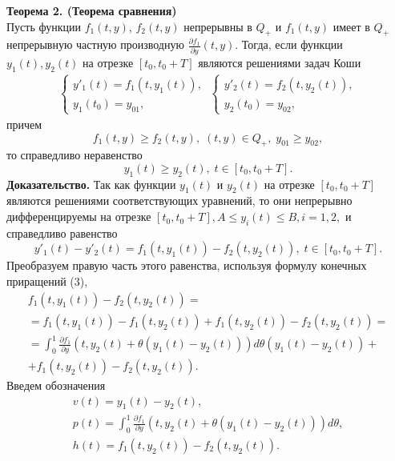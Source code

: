 \textbf{Теорема 2. (Теорема сравнения)}\\
Пусть функции $f_1(t,y)$, $f_2(t,y)$ непрерывны в $Q_+$ и $f_1(t,y)$ имеет в $Q_+$ непрерывную частную производную $\frac{\partial f_1}{\partial y}(t,y)$. Тогда, если функции $y_1(t), y_2(t)$ на отрезке $[t_0,t_0+T]$ являются решениями задач Коши
\begin{equation*}
\begin{split}
\begin{cases}
y'_1(t)=f_1(t,y_1(t)),\\
y_1(t_0)=y_{01},
\end{cases}
\:
\begin{cases}
y'_2(t)=f_2(t,y_2(t)),\\
y_2(t_0)=y_{02},
\end{cases}
\end{split}
\end{equation*}
причем
\begin{equation*}
f_1(t,y)\geq f_2(t,y), \;(t,y)\in Q_+, \;y_{01}\geq y_{02},
\end{equation*}
то справедливо неравенство
\begin{equation*}
y_1(t)\geq y_2(t),\; t\in [t_0,t_0+T].
\end{equation*}
\textbf{Доказательство.} Так как функции $y_1(t)$ и $y_2(t)$ на отрезке $[t_0,t_0+T]$ являются решениями соответствующих уравнений, то они непрерывно дифференцируемы на отрезке $[t_0,t_0+T], A \leq y_i(t) \leq B, i=1,2,$ и справедливо равенство
\begin{equation*}\tag{4}
y'_1(t)-y'_2(t)=f_1(t,y_1(t))-f_2(t,y_2(t)), \;t\in[t_0,t_0+T].
\end{equation*}
Преобразуем правую часть этого равенства, используя формулу конечных приращений (3),
\begin{equation*}
\begin{split}
f_1(t,y_1(t))-f_2(t,y_2(t))= \\
=f_1(t,y_1(t))-f_1(t,y_2(t))+f_1(t,y_2(t))-f_2(t,y_2(t))=\\
=\int_0^1 \frac{\partial f_1}{\partial y}(t,y_2(t)+\theta(y_1(t)-y_2(t)))d\theta(y_1(t)-y_2(t))+\\
+f_1(t,y_2(t))-f_2(t,y_2(t)).
\end{split}
\end{equation*}
Введем обозначения
\begin{equation*}
\begin{split}
v(t)=y_1(t)-y_2(t),\\
p(t)= \int_0^1 \frac{\partial f_1}{\partial y}(t,y_2(t)+\theta(y_1(t)-y_2(t)))d\theta,\\
h(t)=f_1(t,y_2(t))-f_2(t,y_2(t)).
\end{split}
\end{equation*}
